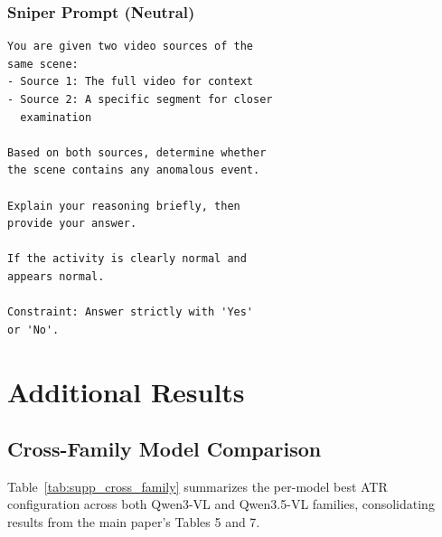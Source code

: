 \documentclass[letterpaper]{article}
\begin{document}
\subsubsection{Sniper Prompt (Neutral)}
\begin{small}
\begin{verbatim}
You are given two video sources of the
same scene:
- Source 1: The full video for context
- Source 2: A specific segment for closer
  examination

Based on both sources, determine whether
the scene contains any anomalous event.

Explain your reasoning briefly, then
provide your answer.

If the activity is clearly normal and
appears normal.

Constraint: Answer strictly with 'Yes'
or 'No'.
\end{verbatim}
\end{small}

\section{Additional Results}
\subsection{Cross-Family Model Comparison}
\label{sec:appendix_cross_family}

Table~\ref{tab:supp_cross_family} summarizes the per-model best ATR configuration across both Qwen3-VL and Qwen3.5-VL families, consolidating results from the main paper's Tables 5 and 7.

\begin{table}[h]
  \centering
  \caption{Cross-family comparison: per-model best ATR configuration on UCF-Crime ($N$=290).}
  \label{tab:supp_cross_family}
\end{table}
\end{document}
